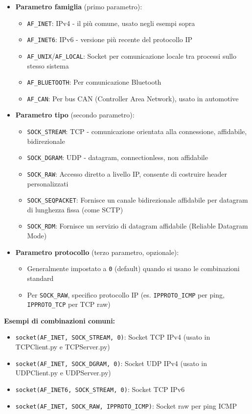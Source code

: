 \begin{itemize}
    \item \textbf{Parametro famiglia} (primo parametro):
    \begin{itemize}
        \item \texttt{AF\_INET}: IPv4 - il più comune, usato negli esempi sopra
        \item \texttt{AF\_INET6}: IPv6 - versione più recente del protocollo IP
        \item \texttt{AF\_UNIX}/\texttt{AF\_LOCAL}: Socket per comunicazione locale tra processi sullo stesso sistema
        \item \texttt{AF\_BLUETOOTH}: Per comunicazione Bluetooth
        \item \texttt{AF\_CAN}: Per bus CAN (Controller Area Network), usato in automotive
    \end{itemize}
    
    \item \textbf{Parametro tipo} (secondo parametro):
    \begin{itemize}
        \item \texttt{SOCK\_STREAM}: TCP - comunicazione orientata alla connessione, affidabile, bidirezionale
        \item \texttt{SOCK\_DGRAM}: UDP - datagram, connectionless, non affidabile
        \item \texttt{SOCK\_RAW}: Accesso diretto a livello IP, consente di costruire header personalizzati
        \item \texttt{SOCK\_SEQPACKET}: Fornisce un canale bidirezionale affidabile per datagram di lunghezza fissa (come SCTP)
        \item \texttt{SOCK\_RDM}: Fornisce un servizio di datagram affidabile (Reliable Datagram Mode)
    \end{itemize}
    
    \item \textbf{Parametro protocollo} (terzo parametro, opzionale):
    \begin{itemize}
        \item Generalmente impostato a \texttt{0} (default) quando si usano le combinazioni standard
        \item Per \texttt{SOCK\_RAW}, specifico protocollo IP (es. \texttt{IPPROTO\_ICMP} per ping, \texttt{IPPROTO\_TCP} per TCP raw)
    \end{itemize}
\end{itemize}

\textbf{Esempi di combinazioni comuni:}
\begin{itemize}
    \item \texttt{socket(AF\_INET, SOCK\_STREAM, 0)}: Socket TCP IPv4 (usato in TCPClient.py e TCPServer.py)
    \item \texttt{socket(AF\_INET, SOCK\_DGRAM, 0)}: Socket UDP IPv4 (usato in UDPClient.py e UDPServer.py)
    \item \texttt{socket(AF\_INET6, SOCK\_STREAM, 0)}: Socket TCP IPv6
    \item \texttt{socket(AF\_INET, SOCK\_RAW, IPPROTO\_ICMP)}: Socket raw per ping ICMP
\end{itemize}

